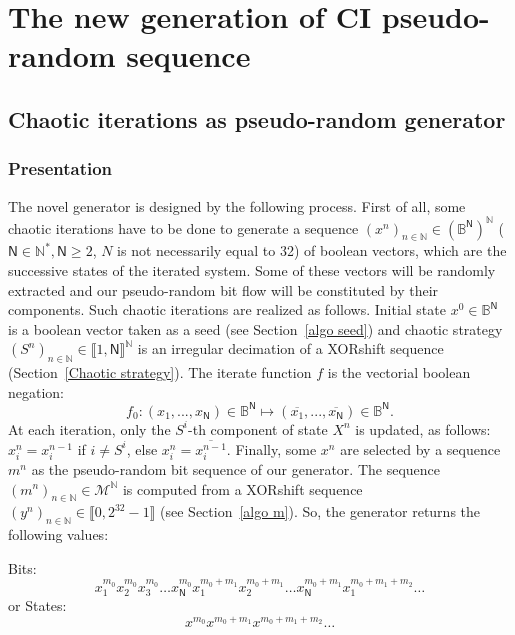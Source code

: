 \documentclass[10pt, a4paper, conference, compsocconf]{IEEEtran}
\begin{document}
\section{The new generation of CI pseudo-random sequence}
\label{The generation of pseudo-random sequence}
\subsection{Chaotic iterations as pseudo-random generator}
\subsubsection{Presentation}
The novel generator is designed by the following process. First of all, some chaotic iterations have to be done to generate a sequence $\left(x^n\right)_{n\in\mathds{N}} \in \left(\mathds{B}^\mathsf{N}\right)^\mathds{N}$ ($\mathsf{N} \in \mathds{N}^*, \mathsf{N} \geqslant 2$, $N$ is not necessarily equal to 32) of boolean vectors, which are the successive states of the iterated system. Some of these vectors will be randomly extracted and our pseudo-random bit flow will be constituted by their components. Such chaotic iterations are realized as follows. Initial state $x^0 \in \mathds{B}^\mathsf{N}$ is a boolean vector taken as a seed (see Section~\ref{algo seed}) and chaotic strategy $\left(S^n\right)_{n\in\mathds{N}}\in \llbracket 1, \mathsf{N} \rrbracket^\mathds{N}$ is 
an irregular decimation of a XORshift sequence (Section~\ref{Chaotic strategy}). The iterate function $f$ is 
the vectorial boolean negation:
$$f_0:(x_1,...,x_\mathsf{N}) \in \mathds{B}^\mathsf{N} \longmapsto (\overline{x_1},...,\overline{x_\mathsf{N}}) \in \mathds{B}^\mathsf{N}.$$
At each iteration, only the $S^i$-th component of state $X^n$ is updated, as follows: $x_i^n = x_i^{n-1}$ if $i \neq S^i$, else $x_i^n = \overline{x_i^{n-1}}$.
Finally, some $x^n$ are selected 
by a sequence $m^n$ as the pseudo-random bit sequence of our generator. The sequence 
$(m^n)_{n \in \mathds{N}} \in \mathcal{M}^\mathds{N}$ is computed from a XORshift sequence $(y^n)_{n \in \mathds{N}} \in \llbracket 0, 2^{32}-1 \rrbracket$ (see Section~\ref{algo m}). So, the 
generator returns the following values:\newline
\begin{small}
Bits:$$x_1^{m_0}x_2^{m_0}x_3^{m_0}\hdots x_\mathsf{N}^{m_0}x_1^{m_0+m_1}x_2^{m_0+m_1}\hdots x_\mathsf{N}^{m_0+m_1} x_1^{m_0+m_1+m_2}\hdots$$
or States:$$x^{m_0}x^{m_0+m_1}x^{m_0+m_1+m_2}\hdots$$
\end{small}
\end{document}

